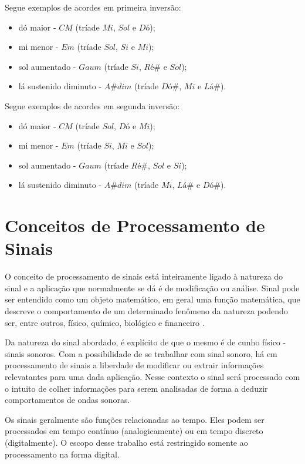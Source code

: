 Segue exemplos de acordes em primeira inversão:
\begin{itemize}
	\item dó maior - $CM$ (tríade $Mi$, $Sol$ e $Dó$);
	\item mi menor - $Em$ (tríade $Sol$, $Si$ e $Mi$);
	\item sol aumentado - $Gaum$ (tríade $Si$, $Ré\#$ e $Sol$);
	\item lá sustenido diminuto - $A\#dim$ (tríade $Dó\#$, $Mi$ e $Lá\#$).
\end{itemize}

Segue exemplos de acordes em segunda inversão:
\begin{itemize}
	\item dó maior - $CM$ (tríade $Sol$, $Dó$ e $Mi$);
	\item mi menor - $Em$ (tríade $Si$, $Mi$ e $Sol$);
	\item sol aumentado - $Gaum$ (tríade $Ré\#$, $Sol$ e $Si$);
	\item lá sustenido diminuto - $A\#dim$ (tríade $Mi$, $Lá\#$ e $Dó\#$).
\end{itemize}

\section{Conceitos de Processamento de Sinais}
\label{sec:conceitosprocessamentosinais}
O conceito de processamento de sinais está inteiramente ligado à natureza do sinal e a aplicação que normalmente se dá é de modificação ou análise. Sinal pode ser entendido como um objeto matemático, em geral uma função matemática, que descreve o comportamento de um determinado fenômeno da natureza podendo ser, entre outros, físico, químico, biológico e financeiro \cite{oppenheim}.

Da natureza do sinal abordado, é explícito de que o mesmo é de cunho físico - sinais sonoros. Com a possibilidade de se trabalhar com sinal sonoro, há em processamento de sinais a liberdade de modificar ou extrair informações relevatantes para uma dada aplicação. Nesse contexto o sinal será processado com o intuito de colher informações para serem analisadas de forma a deduzir comportamentos de ondas sonoras.

Os sinais geralmente são funções relacionadas ao tempo. Eles podem ser processados em tempo contínuo (analogicamente) ou em tempo discreto (digitalmente). O escopo desse trabalho está restringido somente ao processamento na forma digital.

